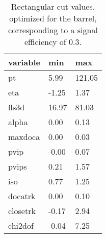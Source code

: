 \begin{table} 
\begin{tabular}{l|ll} 
\hline 
variable & min & max \\ 
\hline 
pt	 &  5.99 & 121.05 \\ 
eta	 & -1.25 &  1.37 \\ 
fls3d	 & 16.97 & 81.03 \\ 
alpha	 &  0.00 &  0.13 \\ 
maxdoca	 &  0.00 &  0.03 \\ 
pvip	 & -0.00 &  0.07 \\ 
pvips	 &  0.21 &  1.57 \\ 
iso	 &  0.77 &  1.25 \\ 
docatrk	 &  0.00 &  0.10 \\ 
closetrk	 & -0.17 &  2.94 \\ 
chi2dof	 & -0.04 &  7.25 \\ 
\hline 
\end{tabular} 
\label{tab:cuts_barrel} 
\caption{Rectangular cut values, optimized for the {\sc barrel}, corresponding to a signal efficiency of 0.3.}
\end{table} 
